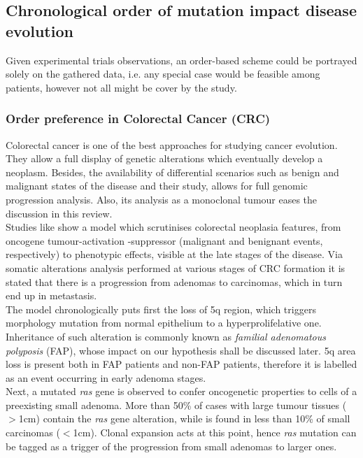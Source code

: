 \subsection{Chronological order of mutation impact disease evolution}
Given experimental trials observations, an order-based scheme could be portrayed solely on the gathered data, i.e. any special case would be feasible among patients, however not all might be cover by the study.

\subsubsection{Order preference in Colorectal Cancer (CRC)}
Colorectal cancer is one of the best approaches for studying cancer evolution. They allow a full display of genetic alterations which eventually develop a neoplasm. Besides, the availability of differential scenarios such as benign and malignant states of the disease and their study, allows for full genomic progression analysis. Also, its analysis as a monoclonal tumour \cite{Fearon1987ClonalTumors} eases the discussion in this review.
\\

Studies like \cite{Fearon1990ATumorigenesis} show a model which scrutinises colorectal neoplasia features, from oncogene  tumour-activation -suppressor (malignant and benignant events, respectively) to phenotypic effects, visible at the late stages of the disease.
Via somatic alterations analysis performed at various stages of CRC formation it is stated that there is a progression from adenomas to carcinomas, which in turn end up in metastasis.
\\

The model chronologically puts first the loss of 5q region, which triggers morphology mutation from normal epithelium to a hyperprolifelative one. Inheritance of such alteration is commonly known as \textit{familial adenomatous polyposis} (FAP), whose impact on our hypothesis shall be discussed later. 5q area loss is present both in FAP patients and non-FAP patients, therefore it is labelled as an event occurring in early adenoma stages.
\\

Next, a mutated \textit{ras} gene is observed to confer oncogenetic properties to cells of a preexisting small adenoma. More than 50\% of cases with large tumour tissues ($>$1cm) contain the \textit{ras} gene alteration, while is found in less than 10\% of small carcinomas ($<$1cm). Clonal expansion acts at this point, hence \textit{ras}\´ mutation can be tagged as a trigger of the progression from small adenomas to larger ones.
\\

